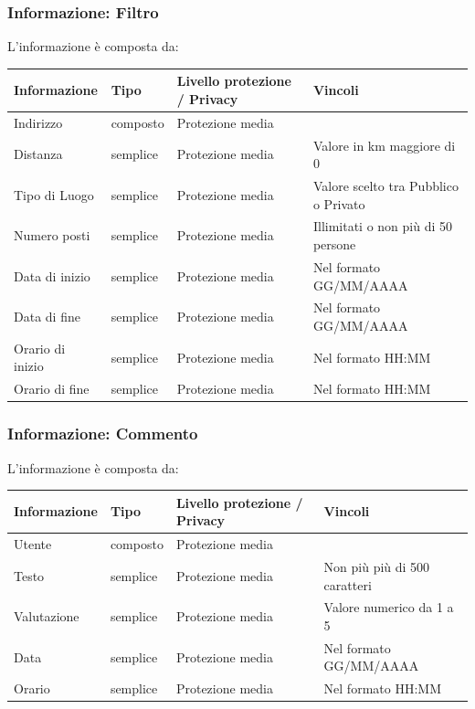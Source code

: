 \documentclass[12pt,a4paper]{report}
\let\oldhyperref\hyperref
\renewcommand{\hyperref}[2][]{\oldhyperref[#1]{\dotuline{#2}}}
\begin{document}
\subsubsection{Informazione: Filtro} \label{Filtro}
L'informazione \hyperref[Filtro]{Filtro} è composta da:
\begin{tabularx}{\textwidth}{|X|X|X|X|}
    \hline
    \rowcolor{studyColor} \textbf{Informazione} & \textbf{Tipo} & \textbf{Livello protezione / Privacy} & \textbf{Vincoli} \\ \hline
    \endhead
    Indirizzo & composto & Protezione media & \\ \hline
    Distanza & semplice & Protezione media & Valore in km maggiore di 0 \\ \hline
    Tipo di Luogo & semplice & Protezione media & Valore scelto tra Pubblico o Privato \\ \hline
    Numero posti & semplice & Protezione media & Illimitati o non più di 50 persone \\ \hline
    Data di inizio & semplice & Protezione media & Nel formato GG/MM/AAAA \\ \hline
    Data di fine & semplice & Protezione media & Nel formato GG/MM/AAAA \\ \hline
    Orario di inizio & semplice & Protezione media & Nel formato HH:MM \\ \hline
    Orario di fine & semplice & Protezione media & Nel formato HH:MM \\ \hline
\end{tabularx}

\subsubsection{Informazione: Commento} \label{Commento}
L'informazione \hyperref[Commento]{Commento} è composta da:
\begin{tabularx}{\textwidth}{|X|X|X|X|}
    \hline
    \rowcolor{studyColor} \textbf{Informazione} & \textbf{Tipo} & \textbf{Livello protezione / Privacy} & \textbf{Vincoli} \\ \hline
    \endhead
    Utente & composto & Protezione media & \\ \hline
    Testo & semplice & Protezione media & Non più più di 500 caratteri \\ \hline
    Valutazione & semplice & Protezione media & Valore numerico da 1 a 5 \\ \hline
    Data & semplice & Protezione media & Nel formato GG/MM/AAAA \\ \hline
    Orario & semplice & Protezione media & Nel formato HH:MM \\ \hline
\end{tabularx}
\end{document}
